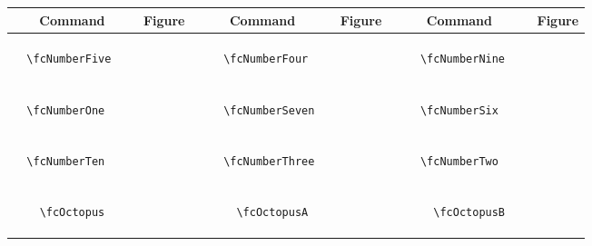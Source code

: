 \documentclass[x11names]{article}
\begin{document}
\begin{table}[H]\centering\begin{tabular}{|c|c|c|c|c|c|}\hline{\bf Command} & {\bf Figure} & {\bf Command} & {\bf Figure} & {\bf Command} & {\bf Figure}\\	\hline	&\multirow{5}{*}{	\fcNumberFive	[scale=0.16]} & &\multirow{5}{*}{	\fcNumberFour	[scale=0.16]} & &\multirow{5}{*}{	\fcNumberNine	[scale=0.16]}\\	& & & & & \\	& & & & & \\	\verb|	\fcNumberFive	| & & \verb|	\fcNumberFour	| & & \verb|	\fcNumberNine	| & \\	& & & & & \\	& & & & & \\	& & & & & \\	\hline									
		&\multirow{5}{*}{	\fcNumberOne	[scale=0.16]} & &\multirow{5}{*}{	\fcNumberSeven	[scale=0.16]} & &\multirow{5}{*}{	\fcNumberSix	[scale=0.16]}\\	& & & & & \\	& & & & & \\	\verb|	\fcNumberOne	| & & \verb|	\fcNumberSeven	| & & \verb|	\fcNumberSix	| & \\	& & & & & \\	& & & & & \\	& & & & & \\	\hline									
		&\multirow{5}{*}{	\fcNumberTen	[scale=0.16]} & &\multirow{5}{*}{	\fcNumberThree	[scale=0.16]} & &\multirow{5}{*}{	\fcNumberTwo	[scale=0.16]}\\	& & & & & \\	& & & & & \\	\verb|	\fcNumberTen	| & & \verb|	\fcNumberThree	| & & \verb|	\fcNumberTwo	| & \\	& & & & & \\	& & & & & \\	& & & & & \\	\hline									
		&\multirow{5}{*}{	\fcOctopus	[scale=0.64]} & &\multirow{5}{*}{	\fcOctopusA	[scale=0.09]} & &\multirow{5}{*}{	\fcOctopusB	[scale=0.09]}\\	& & & & & \\	& & & & & \\	\verb|	\fcOctopus	| & & \verb|	\fcOctopusA	| & & \verb|	\fcOctopusB	| & \\	& & & & & \\	& & & & & \\	& & & & & \\	\hline									

\end{tabular}
\end{table}
\end{document}
